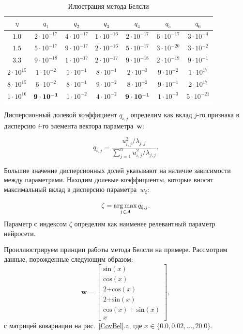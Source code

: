 \begin{table}[h]
\begin{center}
\caption{Илюстрация метода Белсли}
\begin{tabular}{|c|cccccc|}
\hline
$\eta$ & $q_1$& $q_2$& $q_3$& $q_4$& $q_5$& $q_6$\\
\hline
$1.0$ &  $2\cdot 10^{-17}$ &  $4\cdot 10^{-17}$ &  $1\cdot 10^{-16}$ &  $2\cdot 10^{-17}$ &  $6\cdot 10^{-17}$&  $3\cdot 10^{-4}$ \\
\hline
$1.5$ &  $5\cdot 10^{-17}$ &  $9\cdot 10^{-17}$ &  $2\cdot 10^{-16}$ &  $5\cdot 10^{-17}$ &  $3\cdot 10^{-20}$ &  $3\cdot 10^{-2}$ \\
\hline
$3.3$ &  $9\cdot 10^{-18}$ &  $1\cdot 10^{-17}$ &  $2\cdot 10^{-17}$ &  $9\cdot 10^{-18}$ &  $2\cdot 10^{-19}$ &  $9\cdot 10^{-1}$ \\
\hline
$2\cdot 10^{15}$ &  $1\cdot 10^{-2}$ &  $1\cdot 10^{-1}$ &  $8\cdot 10^{-1}$ &  $2\cdot 10^{-3}$ &  $9\cdot 10^{-2}$ &  $1\cdot 10^{17}$ \\ 
\hline
$8\cdot 10^{15}$ &  $6\cdot 10^{-2}$ &  $8\cdot 10^{-1}$ &  $9\cdot 10^{-2}$ &  $8\cdot 10^{-2}$ &  $9\cdot 10^{-1}$ & $ 2\cdot 10^{17} $\\
\hline
$1\cdot 10^{16}$ &  $\bf9\cdot 10^{-1}$ &  $1\cdot 10^{-2}$& $ 4\cdot 10^{-2}$&  $\bf9\cdot 10^{-1}$ &  $1\cdot 10^{-3}$ & $ 5\cdot 10^{-21}$ \\
\hline
\end{tabular}
\label{CovBelTable}
\end{center}
\end{table}

Дисперсионный долевой коэффициент $q_{i,j}$ определим как вклад $j$-го признака в дисперсию $i$-го элемента вектора параметра~$\textbf{w}$:

$$q_{i,j} = \frac{u^2_{i,j}/\lambda_{j,j}}{\sum^n_{j=1}{u^2_{i,j}/\lambda_{j,j}}}.$$

Большие значение дисперсионных долей указывают на наличие зависимости между параметрами. Находим долевые коэффициенты, которые вносят максимальный вклад в дисперсию параметра~$w_{\xi}$:

$$\zeta = \operatorname*{arg\,max}_{j\in \mathcal{A}}{q_{\xi,j}}. $$
Параметр с индексом $\zeta$ определим как наименее релевантный параметр нейросети. 

Проиллюстрируем принцип работы метода Белсли на примере. Рассмотрим данные, порожденные следующим образом: 
$$\textbf{w} = \begin{bmatrix}
\text{sin}(x)\\
\text{cos}(x)\\
\text{2+cos}(x)\\
\text{2+sin}(x)\\
\text{cos}(x) + \text{sin}(x)\\
x
\end{bmatrix},$$
с матрицей ковариации на рис.~\ref{CovBel}.a, где $x \in \{0.0, 0.02, ..., 20.0\}$.


